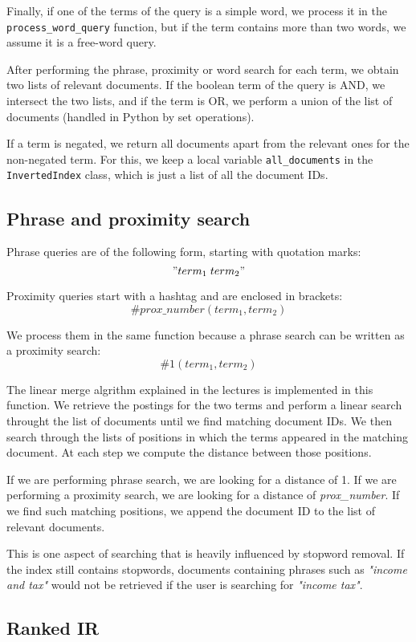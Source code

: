 \documentclass[11pt]{article}
\begin{document}
\begin{multicols}{2}
Finally, if one of the terms of the query is a simple word, we process it in the \verb!process_word_query! function, but if the term contains more than two words, we assume it is a free-word query.

After performing the phrase, proximity or word search for each term, we obtain two lists of relevant documents. If the boolean term of the query is AND, we intersect the two lists, and if the term is OR, we perform a union of the list of documents (handled in Python by set operations). 

If a term is negated, we return all documents apart from the relevant ones for the non-negated term. For this, we keep a local variable \verb!all_documents! in the \verb!InvertedIndex! class, which is just a list of all the document IDs.

\subsection{Phrase and proximity search}
Phrase queries are of the following form, starting with quotation marks:
\["term_1 \; term_2"\]

Proximity queries start with a hashtag and are enclosed in brackets:
\[\#prox\_number(term_1, term_2)\]

We process them in the same function because a phrase search can be written as a proximity search:
\[\#1(term_1, term_2)\]

The linear merge algrithm explained in the lectures is implemented in this function. We retrieve the postings for the two terms and perform a linear search throught the list of documents until we find matching document IDs. We then search through the lists of positions in which the terms appeared in the matching document. At each step we compute the distance between those positions.

If we are performing phrase search, we are looking for a distance of 1. If we are performing a proximity search, we are looking for a distance of \textit{prox\_number}. If we find such matching positions, we append the document ID to the list of relevant documents.

This is one aspect of searching that is heavily influenced by stopword removal. If the index still contains stopwords, documents containing phrases such as \textit{"income and tax"} would not be retrieved if the user is searching for \textit{"income tax"}.

\subsection{Ranked IR}


\end{multicols}
\end{document}
